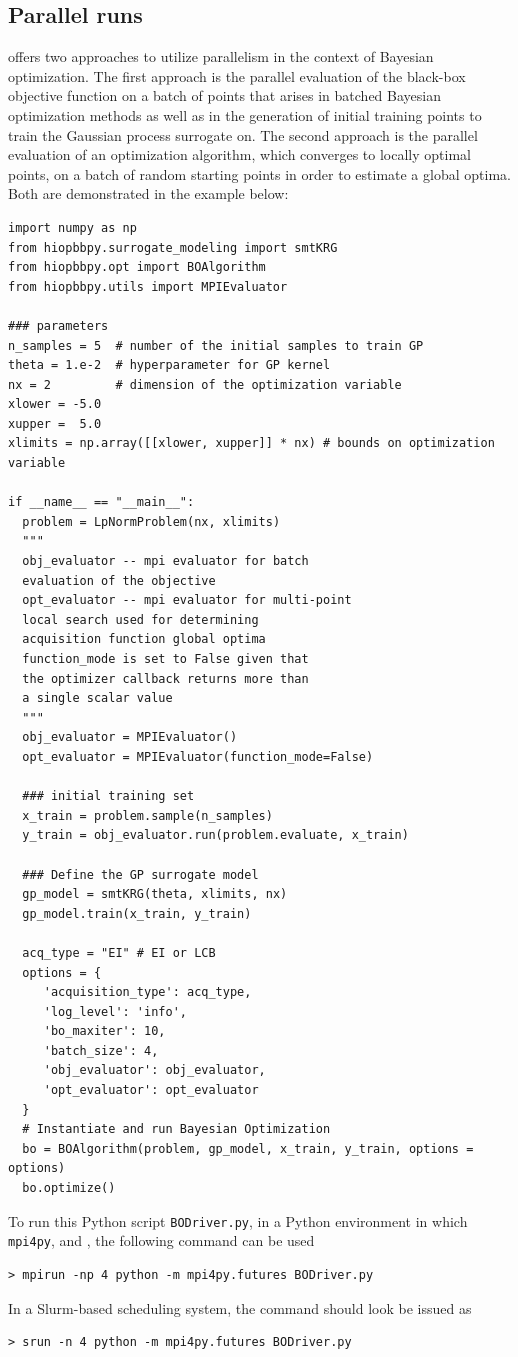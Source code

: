 \subsection{Parallel runs}

\Hibbpy offers two approaches to utilize parallelism in the context of Bayesian optimization. The first approach is the parallel evaluation of the black-box objective function on a batch of points that arises in batched Bayesian optimization methods as well as in the generation of initial training points to train the Gaussian process surrogate on. The second approach is the parallel evaluation of an optimization algorithm, which converges to locally optimal points, on a batch of random starting points in order to estimate a global optima. Both are demonstrated in the example below:

\begin{lstlisting}
import numpy as np
from hiopbbpy.surrogate_modeling import smtKRG
from hiopbbpy.opt import BOAlgorithm
from hiopbbpy.utils import MPIEvaluator

### parameters
n_samples = 5  # number of the initial samples to train GP
theta = 1.e-2  # hyperparameter for GP kernel
nx = 2         # dimension of the optimization variable
xlower = -5.0
xupper =  5.0
xlimits = np.array([[xlower, xupper]] * nx) # bounds on optimization variable

if __name__ == "__main__":
  problem = LpNormProblem(nx, xlimits)
  """
  obj_evaluator -- mpi evaluator for batch
  evaluation of the objective
  opt_evaluator -- mpi evaluator for multi-point
  local search used for determining
  acquisition function global optima
  function_mode is set to False given that
  the optimizer callback returns more than
  a single scalar value
  """
  obj_evaluator = MPIEvaluator()
  opt_evaluator = MPIEvaluator(function_mode=False)

  ### initial training set
  x_train = problem.sample(n_samples)
  y_train = obj_evaluator.run(problem.evaluate, x_train)

  ### Define the GP surrogate model
  gp_model = smtKRG(theta, xlimits, nx)
  gp_model.train(x_train, y_train)

  acq_type = "EI" # EI or LCB
  options = {
     'acquisition_type': acq_type,
     'log_level': 'info',
     'bo_maxiter': 10,
     'batch_size': 4,
     'obj_evaluator': obj_evaluator,
     'opt_evaluator': opt_evaluator
  }
  # Instantiate and run Bayesian Optimization
  bo = BOAlgorithm(problem, gp_model, x_train, y_train, options = options)
  bo.optimize()
\end{lstlisting}

To run this Python script \verb~BODriver.py~, in a Python environment in which \verb~mpi4py~, and \Hibbpy, the following command can be used
\begin{verbatim}
> mpirun -np 4 python -m mpi4py.futures BODriver.py 
\end{verbatim}
In a Slurm-based scheduling system, the command should look be issued as 
\begin{verbatim}
> srun -n 4 python -m mpi4py.futures BODriver.py 
\end{verbatim}
